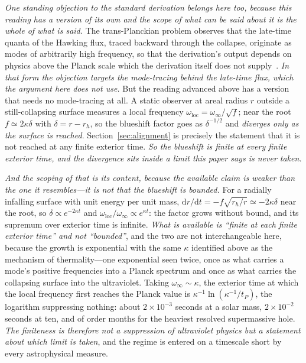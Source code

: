 \documentclass[11pt,a4paper]{article}
\theoremstyle{plain}
\theoremstyle{remark}
\newcommand{\dd}{\mathrm{d}}
\begin{document}
\emph{One standing objection to the standard derivation belongs here too, because this reading has a version of
its own and the scope of what can be said about it is the whole of what is said.} The trans-Planckian problem
observes that the late-time quanta of the Hawking flux, traced backward through the collapse, originate as modes
of arbitrarily high frequency, so that the derivation's output depends on physics above the Planck scale which the
derivation itself does not supply~\cite{Jacobson1991, Unruh1995}. \emph{In that form the objection targets the
mode-tracing behind the late-time flux, which the argument here does not use.} But the reading advanced above has a version that needs no
mode-tracing at all. A static observer at areal radius $r$ outside a still-collapsing surface measures a local
frequency $\omega_{\mathrm{loc}}=\omega_{\infty}/\sqrt{f}$; near the root $f\simeq2\kappa\delta$ with
$\delta=r-r_{h}$, so the blueshift factor goes as $\delta^{-1/2}$ and \emph{diverges only as the surface is
reached}. Section~\ref{sec:alignment} is precisely the statement that it is not reached at any finite exterior time.
\emph{So the blueshift is finite at every finite exterior time, and the divergence sits inside a limit this paper
says is never taken.}

\emph{And the scoping of that is its content, because the available claim is weaker than the one it
resembles---it is not that the blueshift is bounded.} For a radially infalling surface with unit energy per unit
mass, $\dd r/\dd t=-f\sqrt{r_{h}/r}\simeq-2\kappa\delta$ near the root, so $\delta\propto e^{-2\kappa t}$ and
$\omega_{\mathrm{loc}}/\omega_{\infty}\propto e^{\kappa t}$: the factor grows without bound, and its supremum over
exterior time is infinite. \emph{What is available is ``finite at each finite exterior time'' and not
``bounded''}, and the two are not interchangeable here, because the growth is exponential with the same $\kappa$
identified above as the mechanism of thermality---one exponential seen twice, once as what
carries a mode's positive frequencies into a Planck spectrum and once as what carries the collapsing surface into
the ultraviolet. Taking $\omega_{\infty}\sim\kappa$, the exterior time at which the local frequency first reaches
the Planck value is $\kappa^{-1}\ln(\kappa^{-1}/t_{P})$, the logarithm suppressing nothing: about $2\times10^{-3}$
seconds at a solar mass, $2\times10^{-2}$ seconds at ten, and of order months for the heaviest resolved
supermassive hole.
\emph{The finiteness is therefore not a suppression of ultraviolet physics but a statement about which limit is
taken}, and the regime is entered on a timescale short by every astrophysical measure.
\end{document}
